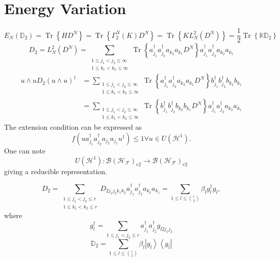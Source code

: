 \documentclass[aps,preprint]{revtex4}%
\begin{document}
\section{Energy Variation}%

\begin{equation}
E_{N}\left(  \mathbb{D}_{2}\right)  =\operatorname{Tr}\left\{  HD^{N}\right\}
=\operatorname{Tr}\left\{  \Gamma_{2}^{N}\left(  K\right)  D^{N}\right\}
=\operatorname{Tr}\left\{  KL_{N}^{2}\left(  D^{N}\right)  \right\}  =\frac
{1}{2}\operatorname{Tr}\left\{  \mathbb{KD}_{2}\right\}
\end{equation}%
\begin{equation}
D_{2}=L_{N}^{2}\left(  D^{N}\right)  =\sum_{\substack{1\leq j_{1}<j_{2}%
\leq\infty\\1\leq k_{1}<k_{2}\leq\infty}}\operatorname{Tr}\left\{  a_{j_{1}%
}^{\dagger}a_{j_{2}}^{\dagger}a_{k_{2}}a_{k_{1}}D^{N}\right\}  a_{j_{1}%
}^{\dagger}a_{j_{2}}^{\dagger}a_{k_{2}}a_{k_{1}}%
\end{equation}%
\begin{align}
u\wedge uD_{2}\left(  u\wedge u\right)  ^{\dagger}  &  =\sum_{\substack{1\leq
j_{1}<j_{2}\leq\infty\\1\leq k_{1}<k_{2}\leq\infty}}\operatorname{Tr}\left\{
a_{j_{1}}^{\dagger}a_{j_{2}}^{\dagger}a_{k_{2}}a_{k_{1}}D^{N}\right\}
b_{j_{1}}^{\dagger}b_{j_{2}}^{\dagger}b_{k_{2}}b_{k_{1}}\nonumber\\
&  =\sum_{\substack{1\leq j_{1}<j_{2}\leq\infty\\1\leq k_{1}<k_{2}\leq\infty
}}\operatorname{Tr}\left\{  b_{j_{1}}^{\dagger}b_{j_{2}}^{\dagger}b_{k_{2}%
}b_{k_{1}}D^{N}\right\}  a_{j_{1}}^{\dagger}a_{j_{2}}^{\dagger}a_{k_{2}%
}a_{k_{1}}%
\end{align}
The extension condition can be expressed as
\begin{equation}
f\left(  ua_{j_{1}}^{\dagger}a_{j_{2}}^{\dagger}a_{j_{2}}a_{j_{1}}u^{\dagger
}\right)  \leq1\forall u\in U\left(  \mathcal{H}^{1}\right)  .
\end{equation}
One can note
\begin{equation}
U\left(  \mathcal{H}^{1}\right)  :\mathcal{B}\left(  \mathcal{H}_{\mathcal{F}%
}\right)  _{e2}\rightarrow\mathcal{B}\left(  \mathcal{H}_{\mathcal{F}}\right)
_{e2}%
\end{equation}
giving a reducible representation.%

\begin{equation}
D_{2}=\sum_{\substack{1\leq j_{1}<j_{2}\leq r\\1\leq k_{1}<k_{2}\leq
r}}D_{2j_{1}j_{2}k_{1}k_{2}}a_{j_{1}}^{\dagger}a_{j_{2}}^{\dagger}a_{k_{2}%
}a_{k_{1}}=\sum_{1\leq l\leq\binom{r}{2}}\beta_{l}g_{l}^{\dagger}g_{l},
\end{equation}
where%
\begin{equation}
g_{l}^{\dagger}=\sum_{1\leq j_{1}<j_{2}\leq r}a_{j_{1}}^{\dagger}a_{j_{2}%
}^{\dagger}g_{l2j_{1}j_{2}}%
\end{equation}%
\begin{equation}
\mathbb{D}_{2}=\sum_{1\leq l\leq\binom{r}{2}}\beta_{l}\left\vert
g_{l}\right\rangle \left\langle g_{l}\right\vert
\end{equation}
\end{document}
